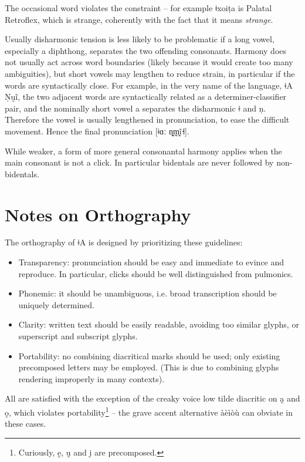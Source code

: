 \documentclass[11pt,a5paper]{book}
\newcommand{\qcn}[1]{\textcolor{AccentText}{\large#1}}
\newcommand{\langname}{\qcn{ǂA}}
\newcommand{\langnamelong}{\qcn{ǂA Ṇṵĩ}}
\begin{document}
The occasional word violates the constraint -- for example \qcn{ǂxoiṭa} is Palatal \textrightarrow{} Retroflex, which is strange, coherently with the fact that it means \emph{strange}. 

Usually disharmonic tension is less likely to be problematic if a long vowel, especially a diphthong, separates the two offending consonants. Harmony does not usually act across word boundaries (likely because it would create too many ambiguities), but short vowels may lengthen to reduce strain, in particular if the words are syntactically close. For example, in the very name of the language, \langnamelong{}, the two adjacent words are syntactically related as a determiner-classifier pair, and the nominally short vowel \qcn{a} separates the disharmonic \qcn{ǂ} and \qcn{ṇ}. Therefore the vowel is usually lengthened in pronunciation, to ease the difficult movement. Hence the final pronunciation [ǂɑː ɳ̰m̩̰ḭ̃˧].

While weaker, a form of more general consonantal harmony applies when the main consonant is not a click. In particular bidentals are never followed by non-bidentals.

\section{Notes on Orthography}

The orthography of \langname{} is designed by prioritizing these guidelines:

\begin{itemize}
	\item Transparency: pronunciation should be easy and immediate to evince and reproduce. In particular, clicks should be well distinguished from pulmonics.
	\item Phonemic: it should be unambiguous, i.e. broad transcrip\-tion should be uniquely determined.
	\item Clarity: written text should be easily readable, avoiding too similar glyphs, or superscript and subscript glyphs.
	\item Portability: no combining diacritical marks should be used; only existing precomposed letters may be employed. (This is due to combining glyphs rendering improperly in many contexts). 
\end{itemize}

All are satisfied with the exception of the creaky voice low tilde diacritic on \qcn{a̰} and \qcn{o̰}, which violates portability\footnote{Curiously, \qcn{ḛ}, \qcn{ṵ} and \qcn{ḭ} are precomposed.} -- the grave accent alternative \qcn{àèìòù} can obviate in these cases.
\end{document}
